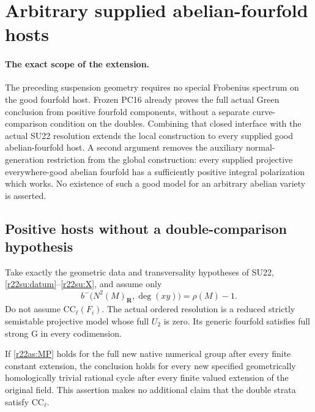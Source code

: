 \section{Arbitrary supplied abelian-fourfold hosts}
\label{r22as:section}

\paragraph{The exact scope of the extension.}
The preceding suspension geometry requires no special Frobenius
spectrum on the good fourfold host.  Frozen PC16 already proves
the full actual Green conclusion from positive fourfold
components, without a separate curve-comparison condition on
the doubles.  Combining that closed interface with the actual
SU22 resolution extends the local construction to every
supplied good abelian-fourfold host.  A second argument removes
the auxiliary normal-generation restriction from the global
construction: every supplied projective everywhere-good
abelian fourfold has a sufficiently positive integral
polarization which works.  No existence of such a good model
for an arbitrary abelian variety is asserted.

\subsection{Positive hosts without a double-comparison hypothesis}

\begin{theorem}
\label{r22as:local}
Take exactly the geometric data and transversality hypotheses
of SU22, \eqref{r22su:datum}--\eqref{r22su:X}, and assume only
\[
             b^-\bigl(N^2(M)_{\mathbf R},\deg(xy)\bigr)
                          =\rho(M)-1.
 \tag{AS22.1}\label{r22as:MP}
\]
Do not assume $\mathrm{CC}_\ell(F_i)$.  The actual ordered
resolution is a reduced strictly semistable projective model
whose full $U_2$ is zero.  Its generic fourfold satisfies full
strong G in every codimension.

If \eqref{r22as:MP} holds for the full new native numerical
group after every finite constant extension, the conclusion
holds for every new specified geometrically homologically
trivial rational cycle after every finite valued extension
of the original field.  This assertion makes no additional
claim that the double strata satisfy $\mathrm{CC}_\ell$.
\end{theorem}

